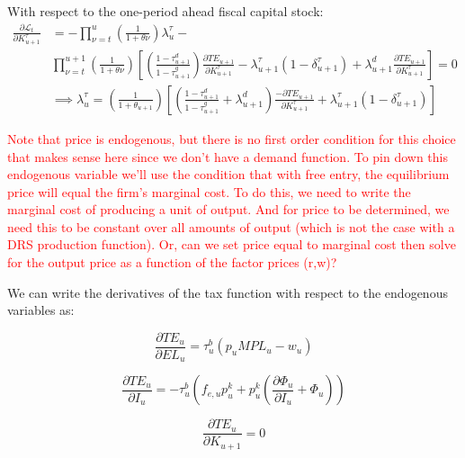 With respect to the one-period ahead fiscal capital stock:
 \begin{equation}
\label{eqn:foc_ktau}
\begin{split}
 \frac{\partial \mathcal{L}_{t}}{\partial K^{\tau}_{u+1}}  &=  - \prod_{\nu=t}^{u}\left(\frac{1}{1+\theta{\nu}}\right)\lambda^{\tau}_{u} -  \\
 & \prod_{\nu=t}^{u+1}\left(\frac{1}{1+\theta{\nu}}\right)\left[\left(\frac{1-\tau^{d}_{u+1}}{1-\tau^{g}_{u+1}}\right)\frac{\partial TE_{u+1}}{\partial K^{\tau}_{u+1}} - \lambda^{\tau}_{u+1}(1-\delta^{\tau}_{u+1}) + \lambda^{d}_{u+1}\frac{\partial TE_{u+1}}{\partial K^{\tau}_{u+1}} \right] = 0 \\
& \implies \lambda^{\tau}_{u} = \left(\frac{1}{1+\theta_{u+1}}\right)\left[\left(\frac{1-\tau^{d}_{u+1}}{1-\tau^{g}_{u+1}} + \lambda^{d}_{u+1} \right)\frac{- \partial TE_{u+1}}{\partial K^{\tau}_{u+1}} + \lambda^{\tau}_{u+1}(1-\delta^{\tau}_{u+1})\right] 
 \end{split}
\end{equation}


\textcolor{red}{Note that price is endogenous, but there is no first order condition for this choice that makes sense here since we don't have a demand function.  To pin down this endogenous variable we'll use the condition that with free entry, the equilibrium price will equal the firm's marginal cost. To do this, we need to write the marginal cost of producing a unit of output.  And for price to be determined, we need this to be constant over all amounts of output (which is not the case with a DRS production function).  Or, can we set price equal to marginal cost then solve for the output price as a function of the factor prices (r,w)? }

We can write the derivatives of the tax function with respect to the endogenous variables as:

\begin{equation}
\label{eqn:d_te_l}
\frac{\partial TE_{u}}{\partial EL_{u}}= \tau^{b}_{u}\left(p_{u}MPL_{u}- w_{u} \right)
\end{equation}

\begin{equation}
\label{eqn:d_te_i}
\frac{\partial TE_{u}}{\partial I_{u}}= -\tau^{b}_{u}\left(f_{e,u}p^{k}_{u} + p^{k}_{u}\left(\frac{\partial \Phi_{u}}{\partial I_{u}} + \Phi_{u}\right)\right)
\end{equation}

\begin{equation}
\label{eqn:d_te_kp1}
\frac{\partial TE_{u}}{\partial K_{u+1}}= 0
\end{equation}

